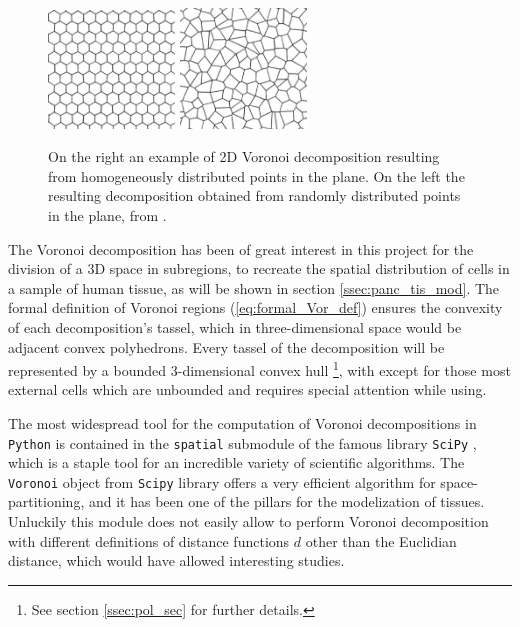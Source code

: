\documentclass[12pt,a4paper]{report}
\begin{document}
    \begin{figure}
        \centering
        \includegraphics[width = 0.3\textwidth]{images/reg_pt}
        \includegraphics[width = 0.3\textwidth]{images/ran_pt}
        \caption{On the right an example of 2D Voronoi decomposition resulting from homogeneously distributed points in the plane. On the left the resulting decomposition obtained from randomly distributed points in the plane, from \cite{ALSAYEDNOOR201644}.}
        \label{fig:diff_pt}
    \end{figure}

    The Voronoi decomposition has been of great interest in this project for the division of a 3D space in subregions, to recreate the spatial distribution of cells in a sample of human tissue, as will be shown in section \ref{ssec:panc_tis_mod}. The formal definition of Voronoi regions (\ref{eq:formal_Vor_def}) ensures the convexity of each decomposition's tassel, which in three-dimensional space would be adjacent convex polyhedrons. Every tassel of the decomposition will be represented by a bounded 3-dimensional convex hull \footnote{See section \ref{ssec:pol_sec} for further details.}, with except for those most external cells which are unbounded and requires special attention while using.

    The most widespread tool for the computation of Voronoi decompositions in \texttt{Python} is contained in the \texttt{spatial} submodule of the famous library \texttt{SciPy} \cite{2020SciPy-NMeth}, which is a staple tool for an incredible variety of scientific algorithms. The \texttt{Voronoi} object from \texttt{Scipy} library offers a very efficient algorithm for space-partitioning, and it has been one of the pillars for the modelization of tissues. Unluckily this module does not easily allow to perform Voronoi decomposition with different definitions of distance functions $d$ other than the Euclidian distance, which would have allowed interesting studies.
\end{document}
